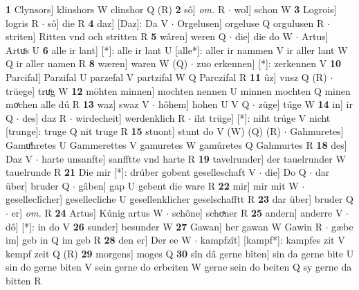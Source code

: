 \documentclass[8pt,a4paper,notitlepage]{article}
\begin{document}
\begin{table}[ht]
\begin{minipage}[t]{0.5\linewidth}
\textbf{1} Clynsors] klinshors W clinshor Q (R) \textbf{2} sô] \textit{om.} R  $\cdot$ wol] schon W \textbf{3} Logrois] logris R  $\cdot$ sô] die R \textbf{4} daz] [Daz]: Da V  $\cdot$ Orgelusen] orgeluse Q orgulusen R  $\cdot$ striten] Ritten vnd och stritten R \textbf{5} wâren] weren Q  $\cdot$ die] die do W  $\cdot$ Artus] Artuͦs U \textbf{6} alle ir lant] [*]: alle ir lant U [alle*]: aller ir nammen V ir aller lant W Q ir aller namen R \textbf{8} wæren] waren W (Q)  $\cdot$ zuo erkennen] [*]: zerkennen V \textbf{10} Parcifal] Parzifal U parzefal V partzifal W Q Parczifal R \textbf{11} ûz] vnsz Q (R)  $\cdot$ trüege] truͦg W \textbf{12} möhten minnen] mochten nennen U minnen mochten Q minen moͯchen alle dú R \textbf{13} waz] swaz V  $\cdot$ hôhem] hohen U V Q  $\cdot$ züge] túge W \textbf{14} in] ir Q  $\cdot$ des] daz R  $\cdot$ wirdecheit] werdenklich R  $\cdot$ iht trüge] [*]: niht trúge V nicht [trunge]: truge Q nit truge R \textbf{15} stuont] stunt do V (W) (Q) (R)  $\cdot$ Gahmuretes] Gamuͦhretes U Gammerettes V gamuretes W gamúretes Q Gahmurtes R \textbf{18} des] Daz V  $\cdot$ harte unsanfte] sanfftte vnd harte R \textbf{19} tavelrunder] der tauelrunder W tauelrunde R \textbf{21} Die mir [*]: drúber gobent geselleschaft V  $\cdot$ die] Do Q  $\cdot$ dar über] bruder Q  $\cdot$ gâben] gap U gebent die ware R \textbf{22} mir] mir mit W  $\cdot$ geselleclîcher] gesellecliche U gesellenklicher geselschafftt R \textbf{23} dar über] bruder Q  $\cdot$ er] \textit{om.} R \textbf{24} Artus] Kúnig artus W  $\cdot$ schône] schoͯner R \textbf{25} andern] anderre V  $\cdot$ dô] [*]: in do V \textbf{26} sunder] besunder W \textbf{27} Gawan] her gawan W Gawin R  $\cdot$ gæbe im] geb in Q im geb R \textbf{28} den er] Der ee W  $\cdot$ kampfzît] [kampf*]: kampfes zit V kempf zeit Q (R) \textbf{29} morgens] moges Q \textbf{30} sîn dâ gerne bîten] sin da gerne bite U sin do gerne biten V sein gerne do erbeiten W gerne sein do beiten Q sy gerne da bitten R \newline
\end{minipage}
\end{table}
\end{document}
